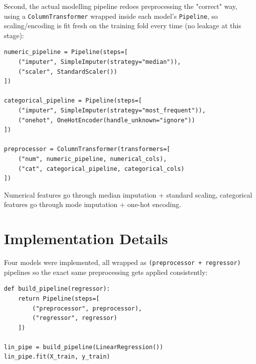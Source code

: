 \documentclass[12pt,a4paper]{article}
\begin{document}
Second, the actual modelling pipeline redoes preprocessing the "correct" way, using a \texttt{ColumnTransformer} wrapped inside each model's \texttt{Pipeline}, so scaling/encoding is fit fresh on the training fold every time (no leakage at this stage):
\begin{lstlisting}[caption={ColumnTransformer used inside every model pipeline}]
numeric_pipeline = Pipeline(steps=[
    ("imputer", SimpleImputer(strategy="median")),
    ("scaler", StandardScaler())
])

categorical_pipeline = Pipeline(steps=[
    ("imputer", SimpleImputer(strategy="most_frequent")),
    ("onehot", OneHotEncoder(handle_unknown="ignore"))
])

preprocessor = ColumnTransformer(transformers=[
    ("num", numeric_pipeline, numerical_cols),
    ("cat", categorical_pipeline, categorical_cols)
])
\end{lstlisting}
Numerical features go through median imputation + standard scaling, categorical features go through mode imputation + one-hot encoding.

\section{Implementation Details}
Four models were implemented, all wrapped as \texttt{(preprocessor + regressor)} pipelines so the exact same preprocessing gets applied consistently:

\begin{lstlisting}[caption={Building each model as a Pipeline}]
def build_pipeline(regressor):
    return Pipeline(steps=[
        ("preprocessor", preprocessor),
        ("regressor", regressor)
    ])

lin_pipe = build_pipeline(LinearRegression())
lin_pipe.fit(X_train, y_train)
\end{lstlisting}
\end{document}
